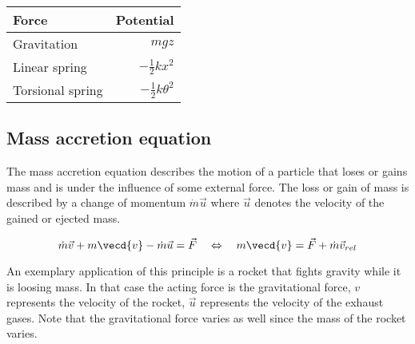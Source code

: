 \documentclass[10pt,a4paper]{scrartcl}
\begin{document}
\begin{multicols*}{2}
\begin{itemize}
\begin{center}
	\begin{tabular}{lr}
		Force & Potential \\
		\hline
		Gravitation & $mgz$ \\
		Linear spring & $-\frac{1}{2}kx^2$ \\
		Torsional spring & $-\frac{1}{2}k\theta^2$
	\end{tabular}
\end{center}
\end{itemize}

\subsection{Mass accretion equation}


The mass accretion equation describes the motion of a particle that loses or gains mass and is under the influence of some external force. The loss or gain of mass is described by a change of momentum $\dot{m}\vec{u}$ where $\vec{u}$ denotes the velocity of the gained or ejected mass.

\begin{equation*}
\dot{m}\vec{v}+m\vecd{v}-\dot{m}\vec{u}=\vec{F}\quad\Leftrightarrow\quad m\vecd{v}=\vec{F}+\dot{m}\vec{v}_{rel}
\end{equation*}


An exemplary application of this principle is a rocket that fights gravity while it is loosing mass. In that case the acting force is the gravitational force, $v$ represents the velocity of the rocket, $\vec{u}$ represents the velocity of the exhaust gases. Note that the gravitational force varies as well since the mass of the rocket varies.


\end{multicols*}
\end{document}
